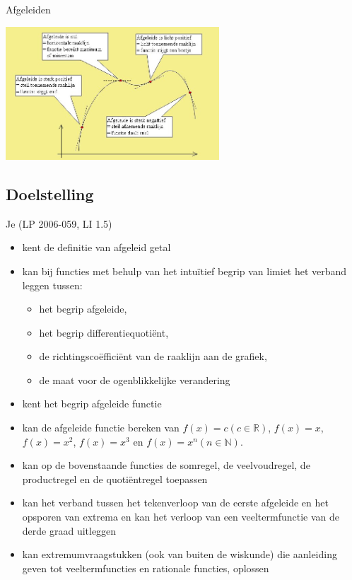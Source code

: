 \documentclass[12pt]{article}
\begin{document}
\thispagestyle{empty}
\begin{center}
  \begin{mdframed}
    \centering
    \fontsize{50}{60}\selectfont Afgeleiden
  \end{mdframed}
  \vfill
  \includegraphics[width=0.6\textwidth]{afgeleide}
  \vfill
\end{center}
\vfill
\subsection*{Doelstelling}
Je \hfill  {\scriptsize(LP 2006-059, LI 1.5)}
\begin{itemize}
\item kent de definitie van afgeleid getal
\item kan bij functies met behulp van het intuïtief begrip van limiet het verband leggen tussen:
  \begin{itemize}
  \item het begrip afgeleide,
  \item het begrip differentiequotiënt,
  \item de richtingscoëfficiënt van de raaklijn aan de grafiek,
  \item de maat voor de ogenblikkelijke verandering
  \end{itemize}
\item kent het begrip afgeleide functie
\item kan de afgeleide functie bereken van $f(x)=c (c\in\mathbb{R})$, $f(x)=x$, $f(x)=x^2$, $f(x)=x^3$ en $f(x)=x^n (n\in\mathbb{N})$.
\item kan op de bovenstaande functies de somregel, de veelvoudregel, de productregel en de quotiëntregel toepassen
\item kan het verband tussen het tekenverloop van de eerste afgeleide en het opsporen van extrema en kan het verloop van een veeltermfunctie van de derde graad uitleggen
\item kan extremumvraagstukken (ook van buiten de wiskunde) die aanleiding geven tot veeltermfuncties en rationale functies, oplossen
\end{itemize}
\end{document}
